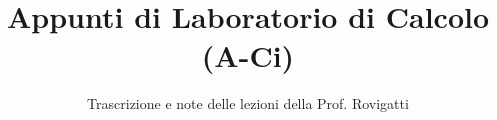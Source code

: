\documentclass[a4paper,12pt]{article}
\title{Appunti di Laboratorio di Calcolo (A-Ci)}
\author{Trascrizione e note delle lezioni della Prof. Rovigatti}
\date{}
\begin{document}
\maketitle
\projectintro
\tableofcontents
\newpage

\end{document}
